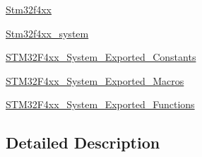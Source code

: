 \begin{DoxyCompactItemize}
\item 
\hyperlink{group__stm32f4xx}{Stm32f4xx}
\item 
\hyperlink{group__stm32f4xx__system}{Stm32f4xx\-\_\-system}
\item 
\hyperlink{group___s_t_m32_f4xx___system___exported___constants}{S\-T\-M32\-F4xx\-\_\-\-System\-\_\-\-Exported\-\_\-\-Constants}
\item 
\hyperlink{group___s_t_m32_f4xx___system___exported___macros}{S\-T\-M32\-F4xx\-\_\-\-System\-\_\-\-Exported\-\_\-\-Macros}
\item 
\hyperlink{group___s_t_m32_f4xx___system___exported___functions}{S\-T\-M32\-F4xx\-\_\-\-System\-\_\-\-Exported\-\_\-\-Functions}
\end{DoxyCompactItemize}


\subsection{Detailed Description}
